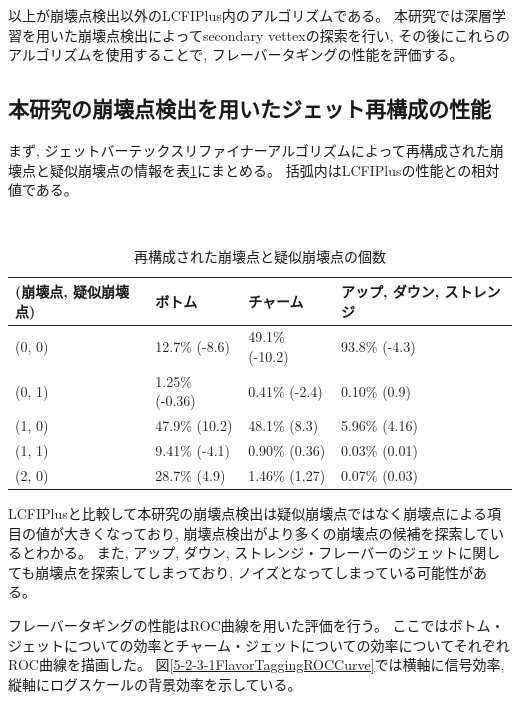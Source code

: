 以上が崩壊点検出以外のLCFIPlus内のアルゴリズムである。
本研究では深層学習を用いた崩壊点検出によってsecondary vettexの探索を行い, その後にこれらのアルゴリズムを使用することで, フレーバータギングの性能を評価する。


\subsection{本研究の崩壊点検出を用いたジェット再構成の性能} \label{Com:FlaTagCom:PerformanceofFlavorTagging}

まず, ジェットバーテックスリファイナーアルゴリズムによって再構成された崩壊点と疑似崩壊点の情報を表\ref{TheNumberofReconstructedVertices}にまとめる。
括弧内はLCFIPlusの性能との相対値である。

\begin{table}[htb]
 \centering
　\small
  \begin{tabular}{l l l l}\hline
    (崩壊点, 疑似崩壊点) & ボトム & チャーム & アップ, ダウン, ストレンジ\\\hline\hline
    (0, 0) & 12.7\% (-8.6) & 49.1\% (-10.2) & 93.8\% (-4.3)\\
    (0, 1) & 1.25\% (-0.36) & 0.41\% (-2.4) & 0.10\% (0.9)\\
    (1, 0) & 47.9\% (10.2) & 48.1\% (8.3) & 5.96\% (4.16)\\
    (1, 1) & 9.41\% (-4.1) & 0.90\% (0.36) & 0.03\% (0.01)\\
    (2, 0) & 28.7\% (4.9) & 1.46\% (1.27) & 0.07\% (0.03)\\\hline
  \end{tabular}
  \caption{再構成された崩壊点と疑似崩壊点の個数}
  \label{TheNumberofReconstructedVertices}
\end{table}

LCFIPlusと比較して本研究の崩壊点検出は疑似崩壊点ではなく崩壊点による項目の値が大きくなっており, 崩壊点検出がより多くの崩壊点の候補を探索しているとわかる。
また, アップ, ダウン, ストレンジ・フレーバーのジェットに関しても崩壊点を探索してしまっており, ノイズとなってしまっている可能性がある。

フレーバータギングの性能はROC曲線を用いた評価を行う。
ここではボトム・ジェットについての効率とチャーム・ジェットについての効率についてそれぞれROC曲線を描画した。
図\ref{5-2-3-1FlavorTaggingROCCurve}では横軸に信号効率, 縦軸にログスケールの背景効率を示している。

